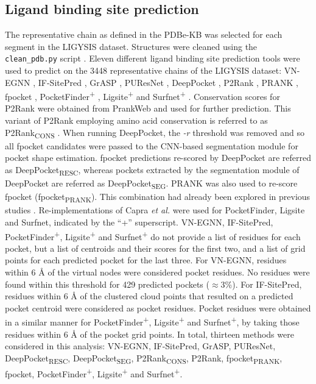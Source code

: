 \subsection{Ligand binding site prediction}

The representative chain as defined in the PDBe-KB was selected for each segment in the LIGYSIS dataset. Structures were cleaned using the \texttt{clean\_pdb.py} script \cite{JUBB_2019_PDBTOOLS}. Eleven different ligand binding site prediction tools were used to predict on the 3448 representative chains of the LIGYSIS dataset: VN-EGNN \cite{SESTAK_2024_VNEGNN}, IF-SitePred \cite{CARBERY_2024_IFSP}, GrASP \cite{SMITH_2024_GrASP}, PUResNet \cite{KANDEL_2021_PURESNET, KANDEL_2024_PURESNET}, DeepPocket \cite{AGGARWAL_2022_DEEPPOCKET}, P2Rank \cite{KRIVAK_2015_P2RANK, KRIVAK_2018_P2RANK}, PRANK \cite{KRIVAK_2015_PRANK}, fpocket \cite{GUILLOUX_2009_FPOCKET, SCHMIDTKE_2010_FPOCKET2}, PocketFinder\textsuperscript{+} \cite{AN_2005_POCKETFINDER}, Ligsite\textsuperscript{+} \cite{HENDLICH_1997_LIGSITE} and Surfnet\textsuperscript{+} \cite{LASKOWSKI_1995_SURFNET}. Conservation scores for P2Rank were obtained from PrankWeb \cite{PRANK_WEB} and used for further prediction. This variant of P2Rank employing amino acid conservation is referred to as P2Rank\textsubscript{CONS} \cite{JENDELE_2019_PRANKWEB, JAKUBEC_2022_PRANKWEB}. When running DeepPocket, the \textit{-r} threshold was removed and so all fpocket candidates were passed to the CNN-based segmentation module for pocket shape estimation. fpocket predictions re-scored by DeepPocket are referred as DeepPocket\textsubscript{RESC}, whereas pockets extracted by the segmentation module of DeepPocket are referred as DeepPocket\textsubscript{SEG}. PRANK was also used to re-score fpocket (fpocket\textsubscript{PRANK}). This combination had already been explored in previous studies \cite{KRIVAK_2015_PRANK, KRIVAK_2015_P2RANK, KRIVAK_2018_P2RANK, COMAJUNCOSA_2024_POCKETS}. Re-implementations of Capra \textit{et al.} \cite{CAPRA_2009_CONCAVITY} were used for PocketFinder, Ligsite and Surfnet, indicated by the ``+'' superscript. VN-EGNN, IF-SitePred, PocketFinder\textsuperscript{+}, Ligsite\textsuperscript{+} and Surfnet\textsuperscript{+} do not provide a list of residues for each pocket, but a list of centroids and their scores for the first two, and a list of grid points for each predicted pocket for the last three. For VN-EGNN, residues within 6 \AA{} of the virtual nodes were considered pocket residues. No residues were found within this threshold for 429 predicted pockets ($\approx$3\%). For IF-SitePred, residues within 6 \AA{} of the clustered cloud points that resulted on a predicted pocket centroid were considered as pocket residues. Pocket residues were obtained in a similar manner for PocketFinder\textsuperscript{+}, Ligsite\textsuperscript{+} and Surfnet\textsuperscript{+}, by taking those residues within 6 \AA{} of the pocket grid points. In total, thirteen methods were considered in this analysis: VN-EGNN, IF-SitePred, GrASP, PUResNet, DeepPocket\textsubscript{RESC}, DeepPocket\textsubscript{SEG}, P2Rank\textsubscript{CONS}, P2Rank, fpocket\textsubscript{PRANK}, fpocket, PocketFinder\textsuperscript{+}, Ligsite\textsuperscript{+} and Surfnet\textsuperscript{+}.

